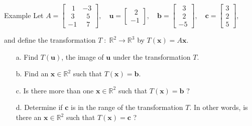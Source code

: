 \documentclass[10pt, aspectratio=169]{beamer}
\begin{document}
\begin{frame}{Example}
Let \( A=
\begin{bmatrix}
    \;\;1 & -3\\
    \:\:3 & \;\;5\\
    -1 & \;\;7
\end{bmatrix},
\quad
\mathbf{u}=
\begin{bmatrix}
    \;\;2\\-1
\end{bmatrix},
\quad 
\mathbf{b}=
\begin{bmatrix}
    \;\;3 \\ \;\;2 \\ -5
\end{bmatrix},
\quad 
\mathbf{c}=
\begin{bmatrix}
    3 \\ 2 \\ 5
\end{bmatrix},
\)

and define the transformation \( T \;: \;\mathbb{R}^2 \to  \mathbb{R}^3 \) by \(T(\mathbf{x}) = A\mathbf{x}\).
\begin{itemize}
    \item[a.] Find \(T(\mathbf{u})\), the image of \(\mathbf{u}\) under the transformation \(T\).
    \item[b.] Find an \(\mathbf{x}\in\mathbb{R}^2\) such that  \(T(\mathbf{x}) = \mathbf{b}\).
    
    
    \item[c.] Is there more than one \(\mathbf{x}\in \mathbb{R}^2\)  such that \(T(\mathbf{x}) = \mathbf{b}\) ?
    \item[d.] Determine if \(\mathbf{c}\) is in the range of the transformation \(T\).
    In other words, is there an \(\mathbf{x}\in\mathbb{R}^2\) such that  \(T(\mathbf{x}) = \mathbf{c}\) ?

\end{itemize}
\end{frame}
\end{document}
